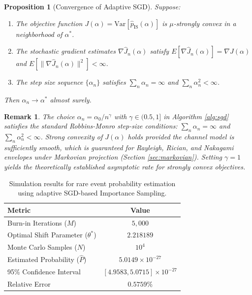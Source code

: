 \documentclass[11pt]{article}
\newtheorem{remark}{Remark}
\newtheorem{proposition}{Proposition}
\begin{document}
\begin{proposition}[Convergence of Adaptive SGD]
\label{prop:sgd_convergence}
Suppose:
\begin{enumerate}
\item The objective function $J(\alpha) = \text{Var}[\hat{p}_\text{IS}(\alpha)]$ is $\mu$-strongly convex in a neighborhood of $\alpha^*$.
\item The stochastic gradient estimates $\nabla \hat{J}_n(\alpha)$ satisfy $E[\nabla \hat{J}_n(\alpha)] = \nabla J(\alpha)$ and $E[\|\nabla \hat{J}_n(\alpha)\|^2] < \infty$.
\item The step size sequence $\{\alpha_n\}$ satisfies $\sum_n \alpha_n = \infty$ and $\sum_n \alpha_n^2 < \infty$.
\end{enumerate}
Then $\alpha_n \to \alpha^*$ almost surely.
\end{proposition}

\begin{remark}
The choice $\alpha_n = \alpha_0 / n^\gamma$ with $\gamma \in (0.5, 1]$ in Algorithm \ref{alg:sgd} satisfies the standard Robbins-Monro step-size conditions: $\sum_n \alpha_n = \infty$ and $\sum_n \alpha_n^2 < \infty$. Strong convexity of $J(\alpha)$ holds provided the channel model is sufficiently smooth, which is guaranteed for Rayleigh, Rician, and Nakagami envelopes under Markovian projection (Section \ref{sec:markovian}). Setting $\gamma = 1$ yields the theoretically established asymptotic rate for strongly convex objectives.
\end{remark}

\begin{table}[htbp]
    \centering
    \caption{Simulation results for rare event probability estimation using adaptive SGD-based Importance Sampling.}
    \begin{tabular}{@{}lc@{}}
        \toprule
        \textbf{Metric} & \textbf{Value} \\
        \midrule
        Burn-in Iterations ($M$) & $5,000$ \\
        Optimal Shift Parameter ($\theta^*$) & $2.218189$ \\
        Monte Carlo Samples ($N$) & $10^4$ \\
        Estimated Probability ($\hat{P}$) & $5.0149 \times 10^{-27}$ \\
        95\% Confidence Interval & $[4.9583 , 5.0715]\times 10^{-27}$ \\
        Relative Error & $0.5759\%$ \\
        \bottomrule
    \end{tabular}
    \label{tab:simulation_results}
\end{table}
\end{document}
